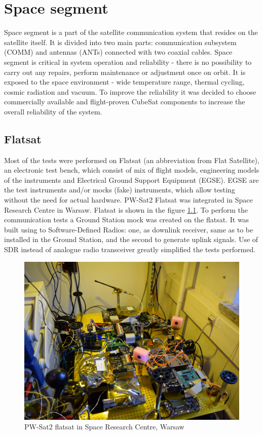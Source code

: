 \chapter{Space segment}
Space segment is a part of the satellite communication system that resides on the satellite itself. It is divided into two main parts: communication subsystem (COMM) and antennas (ANTs) connected with two coaxial cables. Space segment is critical in system operation and reliability - there is no possibility to carry out any repairs, perform maintenance or adjustment once on orbit. It is exposed to the space environment - wide temperature range, thermal cycling, cosmic radiation and vacuum. To improve the reliability it was decided to choose commercially available and flight-proven CubeSat components to increase the overall reliability of the system.

\section{Flatsat}
Most of the tests were performed on Flatsat (an abbreviation from Flat Satellite), an electronic test bench, which consist of mix of flight models, engineering models of the instruments and Electrical Ground Support Equipment (EGSE). EGSE are the test instruments and/or mocks (fake) instruments, which allow testing without the need for actual hardware. PW-Sat2 Flatsat was integrated in Space Research Centre in Warsaw. Flatsat is shown in the figure \ref{flatsat_photo}. To perform the communication tests a Ground Station mock was created on the flatsat. It was built using to Software-Defined Radios: one, as downlink receiver, same as to be installed in the Ground Station, and the second to generate uplink signals. Use of SDR instead of analogue radio transceiver greatly simplified the tests performed.

\begin{figure}[H]
    \centering
    \includegraphics[width=0.48\paperwidth]{img/6/flatsat.jpg}
    \caption{PW-Sat2 flatsat in Space Research Centre, Warsaw}
    \label{flatsat_photo}
\end{figure}

